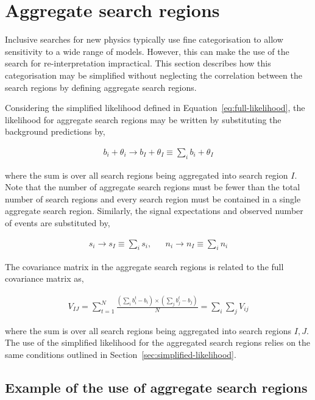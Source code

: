 \section{Aggregate search regions}
\label{sec:aggregate-signal-regions}

Inclusive searches for new physics typically use fine categorisation to allow
sensitivity to a wide range of models. However, this can make the use
of the search for re-interpretation impractical. 
This section describes how this categorisation may be simplified without neglecting the correlation 
between the search regions by defining aggregate search regions.

Considering the simplified likelihood defined in Equation~\ref{eq:full-likelihood},
the likelihood for aggregate search regions may be written by substituting the 
background predictions by,

\begin{align}
b_{i} + \theta_i \rightarrow b_I + \theta_I \equiv \sum_{i}b_{i} + \theta_I
\label{eq:b-agg}
\end{align}

where the sum is over all search regions being aggregated into search region $I$.
Note that the number of aggregate search regions must be fewer than the total number of search regions and 
every search region must be contained in a single aggregate search region. 
Similarly, the signal expectations and observed number of events are substituted by, 

\begin{align}
 s_{i}  \rightarrow s_{I} \equiv \sum_{i}s_{i},  &&  n_{i}  \rightarrow n_{I} \equiv \sum_{i}n_{i} 
\label{eq:b-agg}
\end{align}


The covariance matrix in the aggregate search regions is related to the full covariance matrix as, 

\begin{align}
V_{IJ}=\sum^N_{t=1}{\frac{(\sum_{i}b^t_i-b_{i})\times(\sum_{j}b^t_j-b_{j})}{N}} = \sum_{i}\sum_{j}V_{ij}
\label{eq:agg-cov}
\end{align}

where the sum is over all search regions being aggregated into search regions $I,J$.  The use of the simplified likelihood 
for the aggregated search regions relies on the same conditions outlined in Section~\ref{sec:simplified-likelihood}. 

\subsection{Example of the use of aggregate search regions}
\label{sec:agg-toy}


